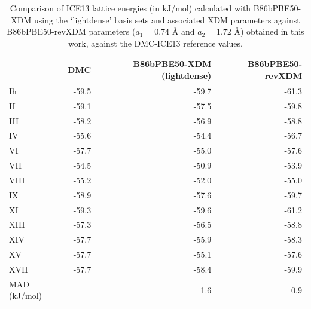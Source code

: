 \begin{table}[h]

\caption{\label{tab:ice13_xdm_compare}Comparison of ICE13 lattice energies (in kJ/mol) calculated with B86bPBE50-XDM using the `lightdense' basis sets and associated XDM parameters against B86bPBE50-revXDM parameters ($a_1 = 0.74$ \AA{} and $a_2 = 1.72$ \AA{}) obtained in this work, against the DMC-ICE13 reference values.}
\begin{tabular}{lrrr}
\toprule
 & DMC & B86bPBE50-XDM (lightdense) & B86bPBE50-revXDM \\ 
\midrule
Ih & -59.5 & -59.7 & -61.3 \\
II & -59.1 & -57.5 & -59.8 \\
III & -58.2 & -56.9 & -58.8 \\
IV & -55.6 & -54.4 & -56.7 \\
VI & -57.7 & -55.0 & -57.6 \\
VII & -54.5 & -50.9 & -53.9 \\
VIII & -55.2 & -52.0 & -55.0 \\
IX & -58.9 & -57.6 & -59.7 \\
XI & -59.3 & -59.6 & -61.2 \\
XIII & -57.3 & -56.5 & -58.8 \\
XIV & -57.7 & -55.9 & -58.3 \\
XV & -57.7 & -55.1 & -57.6 \\
XVII & -57.7 & -58.4 & -59.9 \\
MAD (kJ/mol) &  & 1.6 & 0.9 \\
\bottomrule
\end{tabular}

\end{table}